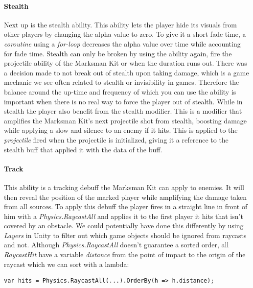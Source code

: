 \paragraph{Stealth}
Next up is the stealth ability. This ability lets the player hide its visuals from other players by changing the alpha value to zero. To give it a short fade time, a \emph{coroutine} using a \emph{for-loop} decreases the alpha value over time while accounting for fade time. Stealth can only be broken by using the ability again, fire the projectile ability of the Marksman Kit or when the duration runs out. There was a decision made to not break out of stealth upon taking damage, which is a game mechanic we see often related to stealth or invisibility in games. Therefore the balance around the up-time and frequency of which you can use the ability is important when there is no real way to force the player out of stealth. While in stealth the player also benefit from the stealth modifier. This is a modifier that amplifies the Marksman Kit's next projectile shot from stealth, boosting damage while applying a slow and silence to an enemy if it hits. This is applied to the \emph{projectile} fired when the projectile is initialized, giving it a reference to the stealth buff that applied it with the data of the buff.

\paragraph{Track}
This ability is a tracking debuff the Marksman Kit can apply to enemies. It will then reveal the position of the marked player while amplifying the damage taken from all sources. To apply this debuff the player fires in a straight line in front of him with a \emph{Physics.RaycastAll} and applies it to the first player it hits that isn't covered by an obstacle. We could potentially have done this differently by using \emph{Layers} in Unity to filter out which game objects should be ignored from raycasts and not. Although \emph{Physics.RaycastAll} doesn't guarantee a sorted order, all \emph{RaycastHit} have a variable \emph{distance} from the point of impact to the origin of the raycast which we can sort with a lambda:

\begin{verbatim}
var hits = Physics.RaycastAll(...).OrderBy(h => h.distance);
\end{verbatim}

